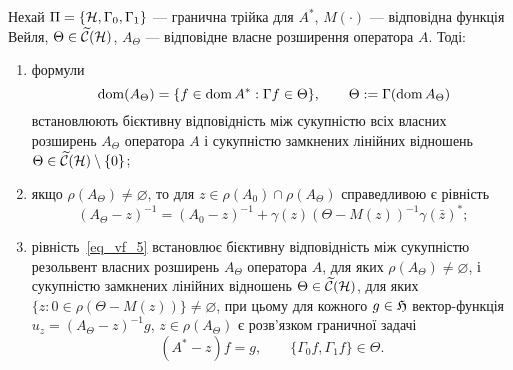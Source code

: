 \begin{theorem}
	Нехай $\Pi=\{\mathcal{H},\Gamma_0,\Gamma_1\}$ --- гранична трійка для $A^*$, $M(\cdot)$ --- відповідна функція Вейля, $\Theta \in \widetilde{\mathcal{C}}(\mathcal{H})$, $A_\Theta$ --- відповідне власне розширення оператора $A$. Тоді:
	\begin{enumerate}
		\item формули
		\begin{equation}~\label{eq_vf_4}
			\operatorname{dom} (A_\Theta) = \{f\in\operatorname{dom} A^*:\Gamma f\in\Theta\}, \qquad \Theta:=\Gamma(\operatorname{dom} A_\Theta)
		\end{equation}
		встановлюють бієктивну відповідність між сукупністю всіх власних розширень $A_\Theta$ оператора $A$ і сукупністю замкнених лінійних відношень $\Theta\in\widetilde{\mathcal{C}}(\mathcal{H})\setminus\{0\}$;
		\item якщо $\rho(A_\Theta)\ne\varnothing$, то для $z\in\rho(A_0)\cap\rho(A_\Theta)$ справедливою є рівність
		\begin{equation}~\label{eq_vf_5}
			(A_\Theta-z)^{-1} = (A_0-z)^{-1} + \gamma(z)(\Theta-M(z))^{-1}\gamma(\bar z)^*;
		\end{equation}
		\item рівність~\eqref{eq_vf_5} встановлює бієктивну відповідність між сукупністю резольвент власних розширень $A_\Theta$ оператора $A$, для яких $\rho(A_\Theta)\ne\varnothing$, і сукупністю замкнених лінійних відношень $\Theta\in\widetilde{\mathcal{C}}(\mathcal{H})$, для яких $\{z:0\in\rho(\Theta - M(z))\}\ne\varnothing$, при цьому для кожного $g\in\mathfrak{H}$ вектор-функція $u_z=(A_\Theta-z)^{-1}g$, $z\in\rho(A_\Theta)$ є розв'язком граничної задачі
		\begin{equation*}
		 	(A^*-z)f = g, \qquad \{\Gamma_0f,\Gamma_1f\}\in\Theta.
		\end{equation*} 
	\end{enumerate}
\end{theorem}


